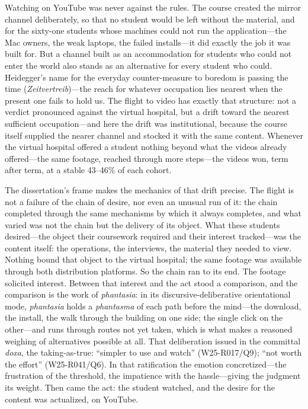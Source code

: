 Watching on YouTube was never against the rules. The course created the
mirror channel deliberately, so that no student would be left without the
material, and for the sixty-one students whose machines could not run the
application---the Mac owners, the weak laptops, the failed installs---it
did exactly the job it was built for. But a channel built as an
accommodation for students who could not enter the world also stands as an
alternative for every student who could. Heidegger's name for the everyday
counter-measure to boredom is passing the time
(\textit{Zeitvertreib})---the reach for whatever occupation lies nearest
when the present one fails to hold us. The flight to video has exactly that
structure: not a verdict pronounced against the virtual hospital, but a
drift toward the nearest sufficient occupation---and here the drift was
institutional, because the course itself supplied the nearer channel and
stocked it with the same content. Whenever the virtual hospital offered a
student nothing beyond what the videos already offered---the same footage,
reached through more steps---the videos won, term after term, at a stable
43--46\% of each cohort.

The dissertation's frame makes the mechanics of that drift precise. The
flight is not a failure of the chain of desire, nor even an unusual run of
it: the chain completed through the same mechanisms by which it always
completes, and what varied was not the chain but the delivery of its
object. What these students desired---the object their coursework required
and their interest tracked---was the content itself: the operations, the
interviews, the material they needed to view. Nothing bound that object to
the virtual hospital; the same footage was available through both
distribution platforms. So the chain ran to its end. The footage solicited
interest. Between that interest and the act stood a comparison, and the
comparison is the work of \textit{phantasia}: in its
discursive-deliberative orientational mode, \textit{phantasia} holds a
\textit{phantasma} of each path before the mind---the download, the
install, the walk through the building on one side; the single click on the
other---and runs through routes not yet taken, which is what makes a
reasoned weighing of alternatives possible at all. That deliberation issued
in the committal \textit{doxa}, the taking-as-true: ``simpler to use and
watch'' (W25-R017/Q9); ``not worth the effort'' (W25-R041/Q6). In that
ratification the emotion concretized---the frustration of the threshold,
the impatience with the hassle---giving the judgment its weight. Then came
the act: the student watched, and the desire for the content was
actualized, on YouTube.

